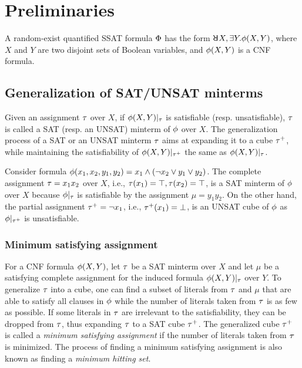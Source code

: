 \section{Preliminaries}
\label{sect:ressat-preliminaries}

A random-exist quantified SSAT formula $\Phi$ has the form $\random{} X,\exists Y.\pf(X,Y)$,
where $X$ and $Y$ are two disjoint sets of Boolean variables,
and $\phi(X,Y)$ is a CNF formula.

\subsection{Generalization of SAT/UNSAT minterms}
\label{sect:ressat-generalize}

Given an assignment $\tau$ over $X$,
if $\phi(X,Y)|_{\tau}$ is satisfiable (resp. unsatisfiable),
$\tau$ is called a SAT (resp. an UNSAT) minterm of $\phi$ over $X$.
The generalization process of a SAT or an UNSAT minterm $\tau$ aims at expanding it to a cube $\tau^+$,
while maintaining the satisfiability of $\phi(X,Y)|_{\tau^+}$ the same as $\phi(X,Y)|_{\tau}$.
\begin{example}
    \label{ex:ressat-assign}
    Consider formula $\phi(x_1,x_2,y_1,y_2)=x_1 \land (\lnot x_2 \lor y_1 \lor y_2)$.
    The complete assignment $\tau = x_1 x_2$ over $X$, i.e., $\tau(x_1)=\top, \tau(x_2)=\top$,
    is a SAT minterm of $\phi$ over $X$ because $\phi|_{\tau}$ is satisfiable by the assignment $\mu = y_1y_2$.
    On the other hand, the partial assignment $\tau^+ = \lnot x_1$, i.e., $\tau^+(x_1)=\bot$,
    is an UNSAT cube of $\phi$ as $\phi|_{\tau^+}$ is unsatisfiable.
\end{example}

\subsubsection{Minimum satisfying assignment}
For a CNF formula $\phi(X,Y)$,
let $\tau$ be a SAT minterm over $X$ and let $\mu$ be a satisfying complete assignment for the induced formula $\phi(X,Y)|_{\tau}$ over $Y$.
To generalize $\tau$ into a cube, one can find a subset of literals from $\tau$ and $\mu$ that are able to satisfy all clauses in $\phi$ while the number of literals taken from $\tau$ is as few as possible.
If some literals in $\tau$ are irrelevant to the satisfiability,
they can be dropped from $\tau$, thus expanding $\tau$ to a SAT cube $\tau^+$.
The generalized cube $\tau^+$ is called a \textit{minimum satisfying assignment} if the number of literals taken from $\tau$ is minimized.
The process of finding a minimum satisfying assignment is also known as finding a \textit{minimum hitting set}.

